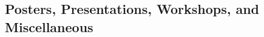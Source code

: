 \subsection{Posters, Presentations, Workshops, and Miscellaneous}
\begin{refsection}
\nocite{*}
\printbibliography[heading=none,sorting=ynt]
\end{refsection}




